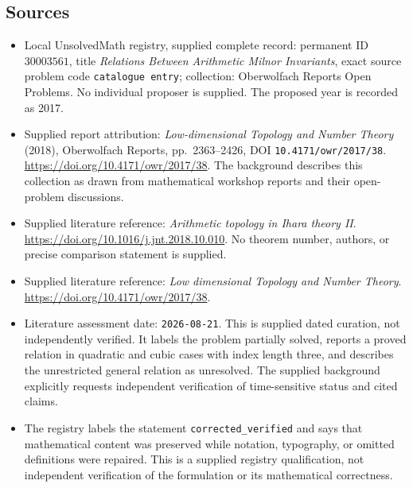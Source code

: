 \documentclass[11pt]{article}
\begin{document}
\subsection{Sources}
\begin{itemize}
\item Local UnsolvedMath registry, supplied complete record: permanent ID \(30003561\), title \emph{Relations Between Arithmetic Milnor Invariants}, exact source problem code \texttt{catalogue entry}; collection: Oberwolfach Reports Open Problems. No individual proposer is supplied. The proposed year is recorded as 2017.
\item Supplied report attribution: \emph{Low-dimensional Topology and Number Theory} (2018), Oberwolfach Reports, pp.~2363--2426, DOI \texttt{10.4171/owr/2017/38}. \url{https://doi.org/10.4171/owr/2017/38}. The background describes this collection as drawn from mathematical workshop reports and their open-problem discussions.
\item Supplied literature reference: \emph{Arithmetic topology in Ihara theory II}. \url{https://doi.org/10.1016/j.jnt.2018.10.010}. No theorem number, authors, or precise comparison statement is supplied.
\item Supplied literature reference: \emph{Low dimensional Topology and Number Theory}. \url{https://doi.org/10.4171/owr/2017/38}.
\item Literature assessment date: \texttt{2026-08-21}. This is supplied dated curation, not independently verified. It labels the problem partially solved, reports a proved relation in quadratic and cubic cases with index length three, and describes the unrestricted general relation as unresolved. The supplied background explicitly requests independent verification of time-sensitive status and cited claims.
\item The registry labels the statement \texttt{corrected\_verified} and says that mathematical content was preserved while notation, typography, or omitted definitions were repaired. This is a supplied registry qualification, not independent verification of the formulation or its mathematical correctness.
\end{itemize}
\end{document}
